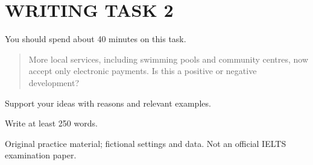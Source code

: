\section*{WRITING TASK 2}
You should spend about 40 minutes on this task.

\begin{quote}\large More local services, including swimming pools and community centres, now accept only electronic payments. Is this a positive or negative development?
\end{quote}
Support your ideas with reasons and relevant examples.

Write at least 250 words.
\par\bigskip
{\footnotesize\color{gray} Original practice material; fictional settings and data. Not an official IELTS examination paper.}
